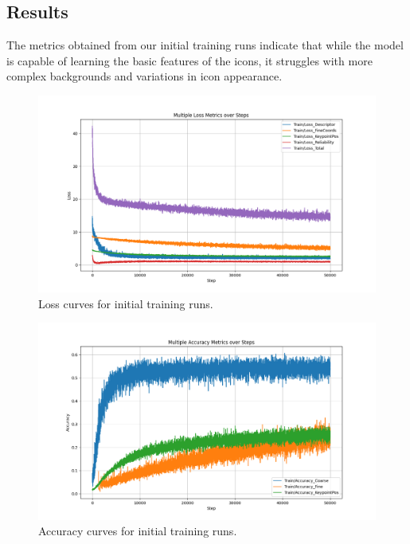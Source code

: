 \subsection{Results}
The metrics obtained from our initial training runs indicate that while the
model is capable of learning the basic features of the icons, it struggles with
more complex backgrounds and variations in icon appearance.
\begin{figure}[H]
    \centering
    \includegraphics[width=\textwidth]{ressources/loss_1.png}
    \caption{Loss curves for initial training runs.}
    \label{fig:loss_curves_1}
\end{figure}
\begin{figure}[H]
    \centering
    \includegraphics[width=\textwidth]{ressources/acc_1.png}
    \caption{Accuracy curves for initial training runs.}
    \label{fig:acc_curves_1}
\end{figure}
